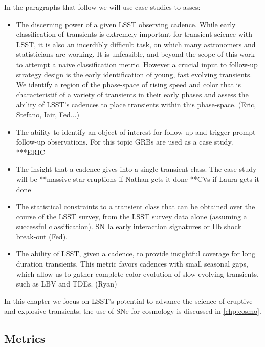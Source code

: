 In the paragraphs that follow we will use case studies to asses:

\begin{itemize}
\item
  The discerning power of a given LSST observing cadence.
  While early classification of transients is extremely important for
  transient science with LSST, it is also an incerdibly difficult task,
  on which many astronomers and statisticians are working. It is unfeasible,
  and beyond the scope of this work to attempt a naive classification metric.
  However a crucial input to follow-up strategy design is the early
  identification of young, fast evolving transients. We identify a region of
  the phase-space of rising speed and color that is characteristif of a
  variety of transients in their early phases and assess the ability of LSST's
  cadences to place transients within this phase-space. (Eric, Stefano, Iair, Fed...)
\item
  The ability to identify an object of interest for follow-up and
  trigger prompt follow-up observations. For this topic GRBs are used as
  a case study. ***ERIC
\item
  The insight that a cadence gives into a single transient class. The
  case study will be
  **massive star eruptions if Nathan gets it done
  **CVs if Laura gets it done
\item 
  The statistical constraints to a transient class that can be obtained
  over the course of the LSST survey, from the LSST survey data alone
  (assuming a successful classification). SN Ia early interaction
  signatures or IIb shock break-out (Fed).
\item
  The ability of LSST, given a cadence, to provide insightful coverage
  for long duration transients. This metric favors cadences with small
  seasonal gaps, which allow us to gather complete color evolution of
  slow evolving transients, such as LBV and TDEs. (Ryan)

\end{itemize}

In this chapter we focus on LSST's potential to advance the science of
eruptive and explosive transients; the use of SNe for cosmology is
discussed in \autoref{chp:cosmo}.



\subsection{Metrics}
\label{sec:\chpname:metrics}

